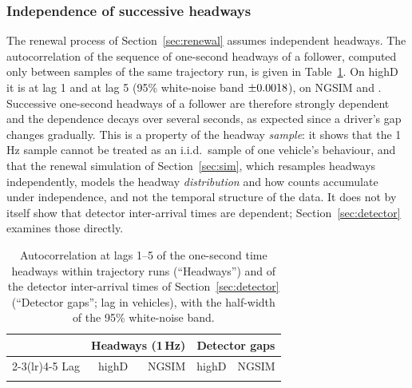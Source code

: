 \documentclass[11pt,a4paper]{article}
\numberwithin{equation}{section}
\begin{document}
\subsubsection{Independence of successive headways}\label{sec:indep}
The renewal process of Section~\ref{sec:renewal} assumes independent headways. The autocorrelation of the sequence of one-second headways of a follower, computed only between samples of the same trajectory run, is given in Table~\ref{tab:autocorr}. On highD it is \hdLagOne{} at lag 1 and \hdLagFive{} at lag 5 (95\% white-noise band $\pm0.0018$), on NGSIM \ngLagOne{} and \ngLagFive.
Successive one-second headways of a follower are therefore strongly dependent and the dependence decays over several seconds, as expected since a driver's gap changes gradually. This is a property of the headway \emph{sample}: it shows that the 1\,Hz sample cannot be treated as an i.i.d.\ sample of one vehicle's behaviour,
and that the renewal simulation of Section~\ref{sec:sim}, which resamples headways independently, models the headway \emph{distribution} and how counts accumulate under independence, and not the temporal structure of the data. It does not by itself show that detector inter-arrival times are dependent; Section~\ref{sec:detector} examines those directly.

\begin{table}[H]
\centering\small
\caption{Autocorrelation at lags 1--5 of the one-second time headways within trajectory runs (``Headways'') and of the detector inter-arrival times of Section~\ref{sec:detector} (``Detector gaps''; lag in vehicles), with the half-width of the 95\% white-noise band.}
\label{tab:autocorr}
\begin{tabular}{@{}lrrrr@{}}
\toprule
 & \multicolumn{2}{c}{Headways (1\,Hz)} & \multicolumn{2}{c}{Detector gaps} \\
\cmidrule(lr){2-3}\cmidrule(lr){4-5}
Lag & highD & NGSIM & highD & NGSIM \\
\midrule
\\
\bottomrule
\end{tabular}
\end{table}
\end{document}
